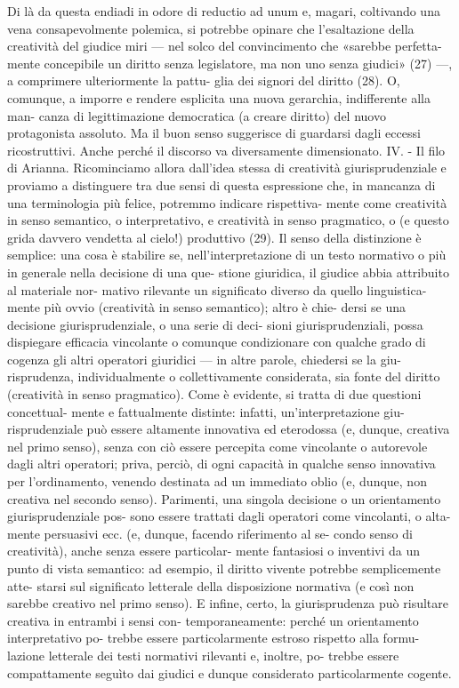 Di  là  da  questa  endiadi  in  odore  di  reductio  ad  unum  e, 
magari,  coltivando  una  vena  consapevolmente  polemica,  si 
potrebbe opinare che l’esaltazione della creatività del giudice 
miri  —  nel  solco  del  convincimento  che  «sarebbe  perfetta-
mente  concepibile  un  diritto  senza  legislatore,  ma  non  uno 
senza giudici» (27) —, a comprimere ulteriormente la pattu-
glia  dei  signori  del  diritto  (28).  O,  comunque,  a  imporre  e 
rendere  esplicita  una nuova gerarchia,  indifferente  alla  man-
canza  di  legittimazione  democratica  (a  creare  diritto)  del 
nuovo protagonista assoluto. Ma il buon senso suggerisce di 
guardarsi dagli eccessi ricostruttivi. Anche perché il discorso 
va diversamente dimensionato. 
IV.  -  Il  filo  di  Arianna.  Ricominciamo  allora  dall’idea 
stessa di creatività giurisprudenziale e proviamo a distinguere  tra  due  sensi  di  questa  espressione  che,  in  mancanza  di 
una  terminologia  più  felice,  potremmo  indicare  rispettiva-
mente come creatività in senso semantico, o interpretativo, e 
creatività  in  senso  pragmatico,  o  (e  questo  grida  davvero 
vendetta  al  cielo!)  produttivo  (29).  Il  senso  della  distinzione 
è semplice: una cosa è stabilire se, nell’interpretazione di un 
testo normativo o più in generale nella decisione di una que-
stione  giuridica,  il  giudice  abbia  attribuito  al  materiale  nor-
mativo rilevante un significato diverso da quello linguistica-
mente più ovvio (creatività in senso semantico); altro è chie-
dersi se una decisione giurisprudenziale, o una serie di deci-
sioni  giurisprudenziali,  possa  dispiegare  efficacia  vincolante 
o  comunque  condizionare  con  qualche  grado  di  cogenza  gli 
altri operatori giuridici — in altre parole, chiedersi se la giu-
risprudenza,  individualmente  o  collettivamente  considerata, 
sia fonte del diritto (creatività in senso pragmatico).  
Come  è  evidente,  si  tratta  di  due  questioni  concettual-
mente e fattualmente distinte: infatti, un’interpretazione giu-
risprudenziale può essere altamente innovativa ed eterodossa 
(e,  dunque,  creativa  nel  primo  senso),  senza  con  ciò  essere 
percepita  come  vincolante  o  autorevole  dagli  altri  operatori; 
priva,  perciò,  di  ogni  capacità  in  qualche  senso  innovativa 
per l’ordinamento, venendo destinata ad un immediato oblio 
(e,  dunque,  non  creativa  nel  secondo  senso).  Parimenti,  una 
singola  decisione  o  un  orientamento  giurisprudenziale  pos-
sono  essere  trattati  dagli  operatori  come  vincolanti,  o  alta-
mente  persuasivi  ecc.  (e,  dunque,  facendo  riferimento  al  se-
condo  senso  di  creatività),  anche  senza  essere  particolar-
mente  fantasiosi  o  inventivi  da  un  punto  di  vista  semantico: 
ad  esempio,  il  diritto  vivente  potrebbe  semplicemente  atte-
starsi sul significato letterale della disposizione normativa (e 
così non sarebbe creativo nel primo senso). E infine, certo, la 
giurisprudenza può risultare creativa in entrambi i sensi con-
temporaneamente: perché un orientamento interpretativo po-
trebbe  essere  particolarmente  estroso  rispetto  alla  formu-
lazione  letterale  dei  testi  normativi  rilevanti  e,  inoltre,  po-
trebbe  essere  compattamente  seguìto  dai  giudici  e  dunque 
considerato particolarmente cogente.  

